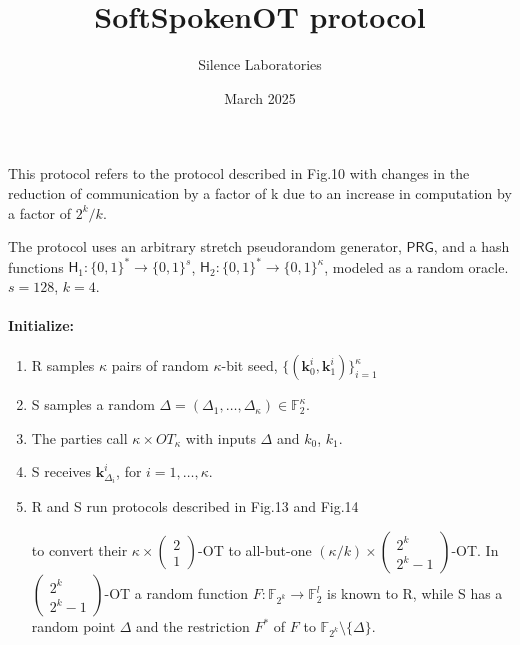 \documentclass{article}
\title{SoftSpokenOT protocol}
\author{Silence Laboratories}
\date{March 2025}
\begin{document}
\maketitle
This protocol refers to the protocol described in Fig.10 \cite{keller2015actively} with changes in the
reduction of communication by a factor of k due to an increase in computation by a factor of $2^k / k$.

The protocol uses an arbitrary stretch pseudorandom generator, $\mathsf{PRG}$, and a hash functions 
$\mathsf{H}_1: \{0,1\}^* \rightarrow \{0,1\}^{s}$, $\mathsf{H}_2: \{0,1\}^* \rightarrow \{0,1\}^{\kappa}$, modeled as a random oracle. \\
$s = 128$, $k = 4$.

\paragraph{Initialize:}
    \begin{enumerate}
        \item R samples $\kappa$ pairs of random $\kappa$-bit seed, $\{(\bm{k}_0^i, \bm{k}_1^i)\}_{i=1}^{\kappa}$
        \item S samples a random $\Delta = (\Delta_1, \dots, \Delta_{\kappa}) \in \mathbb{F}_2^{\kappa}$.
        \item The parties call $\kappa \times OT_{\kappa}$ with inputs $\Delta$ and $k_0$, $k_1$.
        \item S receives $\bm{k}_{\Delta_i}^i$, for $i = 1, \dots, \kappa$.

        \item R and S run protocols described in Fig.13 and Fig.14 \cite{roy2022softspokenot}
        
        to convert their $\kappa \times \left(\begin{array}{c} 2 \\ 1 \end{array} \right)$-OT to all-but-one $(\kappa / k) \times \left(\begin{array}{c} 2^k \\ 2^k - 1 \end{array} \right)$-OT.
        In $\left(\begin{array}{c} 2^k \\ 2^k - 1 \end{array} \right)$-OT a random function $F: \mathbb{F}_{2^k} \rightarrow \mathbb{F}_2^{l}$ is known to R,
    while S has a random point $\Delta$ and the restriction $F^{*}$ of $F$ to $\mathbb{F}_{2^k} \setminus  \{\Delta\}$.
        
    \end{enumerate}
\end{document}
